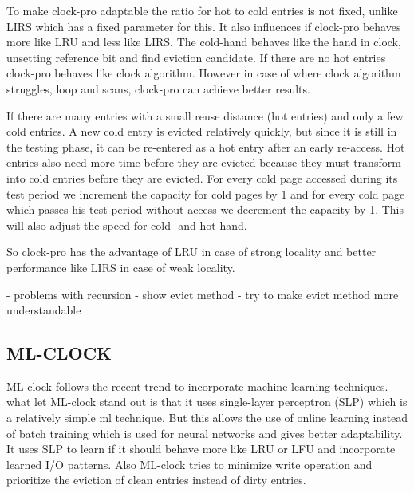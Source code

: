 \documentclass[
	12pt,
	a4paper,
	abstract,
	bibliography=totoc,
	chapterprefix,
	headings=openright,
	numbers=endperiod,
	parskip=half,
	twoside,
]{scrreprt}
\begin{document}
To make clock-pro adaptable the ratio for hot to cold entries is not fixed, unlike LIRS which has a fixed parameter for this.
It also influences if clock-pro behaves more like LRU and less like LIRS.
The cold-hand behaves like the hand in clock, unsetting reference bit and find eviction candidate.
If there are no hot entries clock-pro behaves like clock algorithm. 
However in case of where clock algorithm struggles, loop and scans, clock-pro can achieve better results.

If there are many entries with a small reuse distance (hot entries) and only a few cold entries. A new cold entry is evicted relatively quickly, but since it is still in the testing phase, it can be re-entered as a hot entry after an early re-access.
Hot entries also need more time before they are evicted because they must transform into cold entries before they are evicted.
For every cold page accessed during its test period we increment the capacity for cold pages by 1 and for every cold page which passes his test period without access we decrement the capacity by 1.
This will also adjust the speed  for cold- and hot-hand.

So clock-pro has the advantage of LRU in case of strong locality and better performance like LIRS in case of weak locality.


- problems with recursion
- show evict method 
- try to make evict method more understandable

\subsection{ML-CLOCK}
\label{sub:ml-clock}

ML-clock \cite{cho2021ml} follows the recent trend to incorporate machine learning techniques.
what let ML-clock stand out is that it uses single-layer perceptron (SLP) which is a relatively simple ml technique.
But this allows the use of online learning instead of batch training which is used for neural networks and gives better adaptability.
It uses SLP to learn if it should behave more like LRU or LFU and incorporate learned I/O patterns.
Also ML-clock tries to minimize write operation and prioritize the eviction of clean entries instead of dirty entries.
\end{document}
